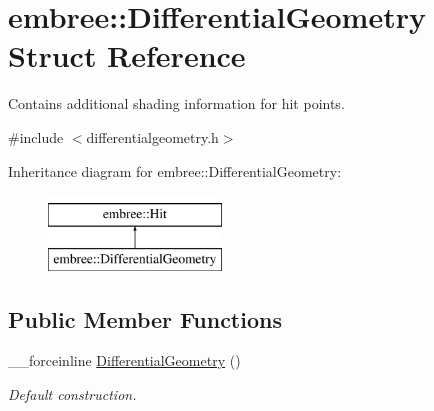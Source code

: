 \hypertarget{structembree_1_1_differential_geometry}{
\section{embree::DifferentialGeometry Struct Reference}
\label{structembree_1_1_differential_geometry}
}


Contains additional shading information for hit points.  




{\ttfamily \#include $<$differentialgeometry.h$>$}

Inheritance diagram for embree::DifferentialGeometry:\begin{figure}[H]
\begin{center}
\leavevmode
\includegraphics[height=2.000000cm]{structembree_1_1_differential_geometry}
\end{center}
\end{figure}
\subsection*{Public Member Functions}
\begin{DoxyCompactItemize}
\item 
\_\-\_\-forceinline \hyperlink{structembree_1_1_differential_geometry_af08517cad4d361acc64b468418db1a34}{DifferentialGeometry} ()
\begin{DoxyCompactList}\small\item\em Default construction. \item\end{DoxyCompactList}\end{DoxyCompactItemize}
